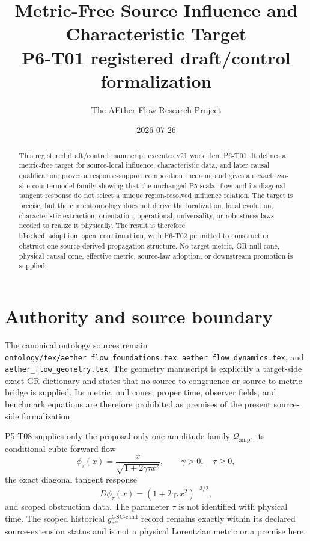 \documentclass[11pt]{article}
\title{Metric-Free Source Influence and Characteristic Target\\
\large P6-T01 registered draft/control formalization}
\author{The AEther-Flow Research Project}
\date{2026-07-26}
\begin{document}
\maketitle

\begin{abstract}
This registered draft/control manuscript executes v21 work item P6-T01.  It
defines a metric-free target for source-local influence, characteristic data,
and later causal qualification; proves a response-support composition
theorem; and gives an exact two-site countermodel family showing that the
unchanged P5 scalar flow and its diagonal tangent response do not select a
unique region-resolved influence relation.  The target is precise, but the
current ontology does not derive the localization, local evolution,
characteristic-extraction, orientation, operational, universality, or
robustness laws needed to realize it physically.  The result is therefore
\texttt{blocked\_adoption\_open\_continuation}, with P6-T02 permitted to
construct or obstruct one source-derived propagation structure.  No target
metric, GR null cone, physical causal cone, effective metric, source-law
adoption, or downstream promotion is supplied.
\end{abstract}

\section{Authority and source boundary}

The canonical ontology sources remain
\texttt{ontology/tex/aether\_flow\_foundations.tex},
\texttt{aether\_flow\_dynamics.tex}, and
\texttt{aether\_flow\_geometry.tex}.  The geometry manuscript is explicitly a
target-side exact-GR dictionary and states that no source-to-congruence or
source-to-metric bridge is supplied.  Its metric, null cones, proper time,
observer fields, and benchmark equations are therefore prohibited as premises
of the present source-side formalization.

P5-T08 supplies only the proposal-only one-amplitude family
\(\mathcal Q_{\mathrm{amp}}\), its conditional cubic forward flow
\[
 \phi_\tau(x)=\frac{x}{\sqrt{1+2\gamma\tau x^2}},
 \qquad \gamma>0,\quad \tau\geq0,
\]
the exact diagonal tangent response
\[
 D\phi_\tau(x)=(1+2\gamma\tau x^2)^{-3/2},
\]
and scoped obstruction data.  The parameter \(\tau\) is not identified with
physical time.  The scoped historical
\(g_{\mathrm{eff}}^{\mathrm{GSC\mbox{-}cand}}\) record remains exactly within
its declared source-extension status and is not a physical Lorentzian metric
or a premise here.
\end{document}
